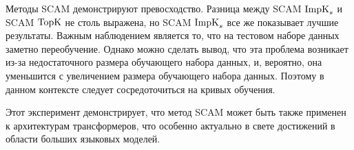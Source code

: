     Методы SCAM демонстрируют превосходство. Разница между SCAM $\operatorname{ImpK}_s$ и SCAM $\operatorname{TopK}$ не столь выражена, но SCAM $\operatorname{ImpK}_s$ все же показывает лучшие результаты. Важным наблюдением является то, что на тестовом наборе данных заметно переобучение. Однако можно сделать вывод, что эта проблема возникает из-за недостаточного размера обучающего набора данных, и, вероятно, она уменьшится с увеличением размера обучающего набора данных. Поэтому в данном контексте следует сосредоточиться на кривых обучения.

    Этот эксперимент демонстрирует, что метод SCAM может быть также применен к архитектурам трансформеров, что особенно актуально в свете достижений в области больших языковых моделей.
